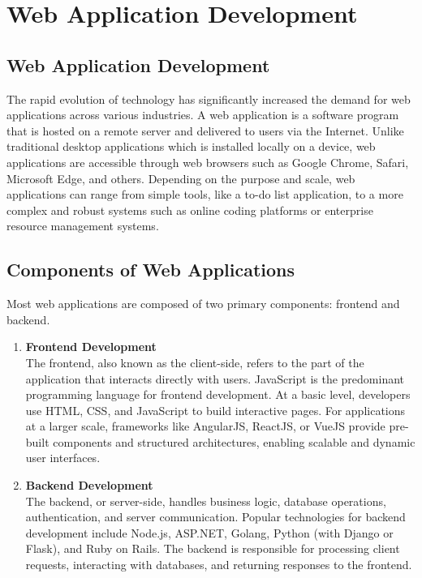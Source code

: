 \section{Web Application Development}

\subsection*{Web Application Development}

The rapid evolution of technology has significantly increased the demand for web applications across various industries. A web application is a software program that is hosted on a remote server and delivered to users via the Internet. Unlike traditional desktop applications which is installed locally on a device, web applications are accessible through web browsers such as Google Chrome, Safari, Microsoft Edge, and others. Depending on the purpose and scale, web applications can range from simple tools, like a to-do list application, to a more complex and robust systems such as online coding platforms or enterprise resource management systems.\cite{lambdatest_web_application_developement}\\
\subsection*{Components of Web Applications}

Most web applications are composed of two primary components: frontend and backend.

\begin{enumerate}
    \item \textbf{Frontend Development}\\
    The frontend, also known as the client-side, refers to the part of the application that interacts directly with users. JavaScript is the predominant programming language for frontend development. At a basic level, developers use HTML, CSS, and JavaScript to build interactive pages. For applications at a larger scale, frameworks like AngularJS, ReactJS, or VueJS provide pre-built components and structured architectures, enabling scalable and dynamic user interfaces.

    \item \textbf{Backend Development}\\
    The backend, or server-side, handles business logic, database operations, authentication, and server communication. Popular technologies for backend development include Node.js, ASP.NET, Golang, Python (with Django or Flask), and Ruby on Rails. The backend is responsible for processing client requests, interacting with databases, and returning responses to the frontend.
\end{enumerate}

